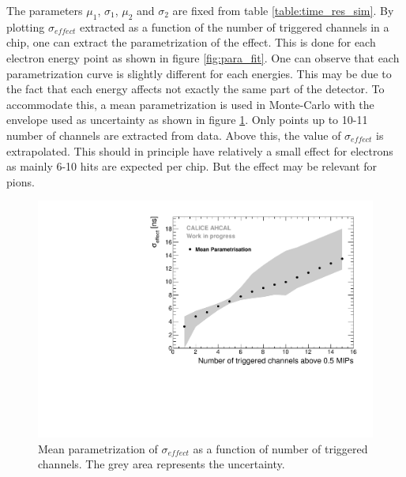The parameters $\mu_1$, $\sigma_1$, $\mu_2$ and $\sigma_2$ are fixed from table \ref{table:time_res_sim}. By plotting $\sigma_{effect}$ extracted as a function of the number of triggered channels in a chip, one can extract the parametrization of the effect. This is done for each electron energy point as shown in figure \ref{fig:para_fit}. One can observe that each parametrization curve is slightly different for each energies. This may be due to the fact that each energy affects not exactly the same part of the detector. To accommodate this, a mean parametrization is used in Monte-Carlo with the envelope used as uncertainty as shown in figure \ref{fig:mean_para}. Only points up to 10-11 number of channels are extracted from data. Above this, the value of $\sigma_{effect}$ is extrapolated. This should in principle have relatively a small effect for electrons as mainly 6-10 hits are expected per chip. But the effect may be relevant for pions.

\begin{figure}[htbp!]
	\centering
	\includegraphics[width=0.7\linewidth]{../Thesis_Plots/Timing/Electrons/Plots/MeanParametrisationWithSystErrors.pdf}
	\caption{Mean parametrization of $\sigma_{effect}$ as a function of number of triggered channels. The grey area represents the uncertainty.}
	\label{fig:mean_para}
\end{figure}
